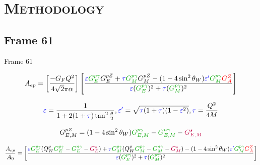 \documentclass[xcolor=x11names,compress,8pt]{beamer}
\renewcommand{\(}{\begin{columns}}
\renewcommand{\)}{\end{columns}}
\newcommand{\<}[1]{\begin{column}{#1}}
\renewcommand{\>}{\end{column}}
\begin{document}
\section{\scshape Methodology}
\subsection{Frame 61}

\begin{frame}{Frame 61}

\fontsize{6pt}{7.2}\selectfont

\begin{equation} \label{equ:qweak1}
A_{ep} = \left[ \frac{-G_{F}Q^{2}}{4 \sqrt{2}\pi\alpha} \right] \left[ \frac{\textcolor{blue}{\varepsilon} \textcolor{darkgreen}{G_{E}^{p\gamma}}G_{E}^{pZ} + \textcolor{blue}{\tau} \textcolor{darkgreen}{G_{M}^{p\gamma}}G_{M}^{pZ} - (1-4\sin^{2}\theta_{W})\textcolor{blue}{\varepsilon^{\prime}}\textcolor{darkgreen}{G_{M}^{p\gamma}}\textcolor{red}{G_{A}^{Z}} } { \textcolor{blue}{\varepsilon}(\textcolor{darkgreen}{G_{E}^{p\gamma}})^{2} + \textcolor{blue}{\tau}(\textcolor{darkgreen}{G_{M}^{p\gamma}})^{2} } \right]
\end{equation}

\begin{equation} \label{equ:qweak2}
\textcolor{blue}{\varepsilon} = \frac{1}{1 + 2(1+\textcolor{blue}{\tau})\tan^{2}\frac{\theta}{2}}, \textcolor{blue}{\varepsilon^{\prime}} = \sqrt{\textcolor{blue}{\tau}(1+\textcolor{blue}{\tau})(1 - \textcolor{blue}{\varepsilon}^{2})}, \textcolor{blue}{\tau} = \frac{Q^{2}}{4M}
\end{equation}

\begin{equation} \label{equ:qweak3}
G_{E,M}^{pZ} = (1 - 4\sin^{2} \theta_{W}) \textcolor{darkgreen}{G_{E,M}^{p\gamma}} - \textcolor{darkgreen}{G_{E,M}^{n\gamma}} - \textcolor{purple}{G_{E,M}^{s}}
\end{equation}

\begin{equation} \label{equ:qweak4}
\frac{A_{ep}}{A_{0}} = \left[ \frac{\textcolor{blue}{\varepsilon} \textcolor{darkgreen}{G_{E}^{p\gamma}} (Q_{W}^{p} \textcolor{darkgreen}{G_{E}^{p\gamma}} - \textcolor{darkgreen}{G_{E}^{n\gamma}} - \textcolor{purple}{G_{E}^{s}} ) + \textcolor{blue}{\tau} \textcolor{darkgreen}{G_{M}^{p\gamma}} (Q_{W}^{p} \textcolor{darkgreen}{G_{M}^{p\gamma}} - \textcolor{darkgreen}{G_{M}^{n\gamma}} - \textcolor{purple}{G_{M}^{s}} ) - (1-4\sin^{2}\theta_{W})\textcolor{blue}{\varepsilon^{\prime}}\textcolor{darkgreen}{G_{M}^{p\gamma}}\textcolor{red}{G_{A}^{Z}} } { \textcolor{blue}{\varepsilon}(\textcolor{darkgreen}{G_{E}^{p\gamma}})^{2} + \textcolor{blue}{\tau}(\textcolor{darkgreen}{G_{M}^{p\gamma}})^{2} } \right]
\end{equation}


\end{frame}
\end{document}
